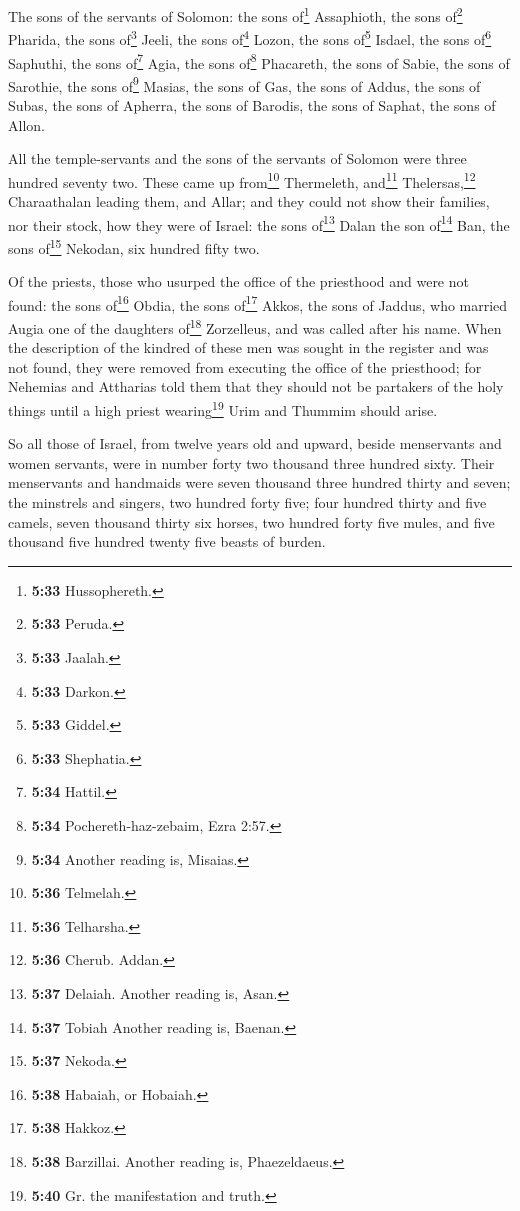  The sons of the servants of Solomon: the sons
of\footnote{\textbf{5:33} Hussophereth.} Assaphioth, the sons
of\footnote{\textbf{5:33} Peruda.} Pharida, the sons of\footnote{\textbf{5:33}
  Jaalah.} Jeeli, the sons of\footnote{\textbf{5:33} Darkon.} Lozon, the
sons of\footnote{\textbf{5:33} Giddel.} Isdael, the sons of\footnote{\textbf{5:33}
  Shephatia.} Saphuthi,  the sons of\footnote{\textbf{5:34}
  Hattil.} Agia, the sons of\footnote{\textbf{5:34}
  Pochereth-haz-zebaim, Ezra 2:57.} Phacareth, the sons of Sabie, the
sons of Sarothie, the sons of\footnote{\textbf{5:34} Another reading is,
  Misaias.} Masias, the sons of Gas, the sons of Addus, the sons of
Subas, the sons of Apherra, the sons of Barodis, the sons of Saphat, the
sons of Allon.

 All the temple-servants and the sons of the servants of
Solomon were three hundred seventy two.  These came up
from\footnote{\textbf{5:36} Telmelah.} Thermeleth, and\footnote{\textbf{5:36}
  Telharsha.} Thelersas,\footnote{\textbf{5:36} Cherub. Addan.}
Charaathalan leading them, and Allar;  and they could not
show their families, nor their stock, how they were of Israel: the sons
of\footnote{\textbf{5:37} Delaiah. Another reading is, Asan.} Dalan the
son of\footnote{\textbf{5:37} Tobiah Another reading is, Baenan.} Ban,
the sons of\footnote{\textbf{5:37} Nekoda.} Nekodan, six hundred fifty
two.

 Of the priests, those who usurped the office of the
priesthood and were not found: the sons of\footnote{\textbf{5:38}
  Habaiah, or Hobaiah.} Obdia, the sons of\footnote{\textbf{5:38}
  Hakkoz.} Akkos, the sons of Jaddus, who married Augia one of the
daughters of\footnote{\textbf{5:38} Barzillai. Another reading is,
  Phaezeldaeus.} Zorzelleus, and was called after his name.
 When the description of the kindred of these men was
sought in the register and was not found, they were removed from
executing the office of the priesthood;  for Nehemias and
Attharias told them that they should not be partakers of the holy things
until a high priest wearing\footnote{\textbf{5:40} Gr. the manifestation
  and truth.} Urim and Thummim should arise.

 So all those of Israel, from twelve years old and
upward, beside menservants and women servants, were in number forty two
thousand three hundred sixty.  Their menservants and
handmaids were seven thousand three hundred thirty and seven; the
minstrels and singers, two hundred forty five;  four
hundred thirty and five camels, seven thousand thirty six horses, two
hundred forty five mules, and five thousand five hundred twenty five
beasts of burden.

